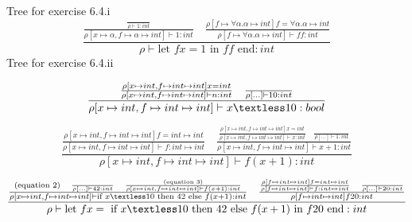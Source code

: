 \documentclass[]{report}
\begin{document}
Tree for exercise 6.4.i
\begin{equation}
\frac{\frac{\frac{}{\rho \vdash 1:int}}{\rho [x \mapsto \alpha ,f \mapsto \alpha \mapsto int] \vdash 1:int} \quad \frac{\rho [f \mapsto \forall \alpha . \alpha \mapsto int ] f = \forall \alpha . \alpha \mapsto int }{\rho [f \mapsto \forall \alpha . \alpha \mapsto int ] \vdash f f: int}}{\rho \vdash \text{let } f x = 1 \text{ in } f f \text{ end}:int}
\end{equation}
Tree for exercise 6.4.ii

\begin{equation}
\frac{\frac{\rho [x \mapsto int, f \mapsto int \mapsto int] x = int}{\rho [x \mapsto int, f \mapsto int \mapsto int] \vdash n : int} \quad \frac{}{\rho [...] \vdash 10:int}}{\rho [x \mapsto int, f \mapsto int \mapsto int] \vdash x \textless 10:bool}
\end{equation}

\begin{equation}
\frac{\frac{\rho [x \mapsto int, f \mapsto int \mapsto int] f = int \mapsto int}{\rho [x \mapsto int, f \mapsto int \mapsto int] \vdash f : int \mapsto int} \quad \frac{\frac{\rho [x \mapsto int, f \mapsto int \mapsto int] x = int }{\rho [x \mapsto int, f \mapsto int \mapsto int] \vdash x:int} \quad \frac{}{\rho [...] \vdash 1:int}}{\rho [x \mapsto int, f \mapsto int \mapsto int] \vdash x + 1:int}}{\rho [x \mapsto int, f \mapsto int \mapsto int] \vdash f(x+1):int}
\end{equation}

\begin{equation}
\frac{\frac{ (\text{equation } 2) \quad \frac{}{\rho [...] \vdash 42 : int} \quad \frac{\text{(equation } 3)}{\rho [x \mapsto int, f \mapsto int \mapsto int ] \vdash f(x+1):int}}{\rho [x \mapsto int, f \mapsto int \mapsto int] \vdash \text{if } x \textless 10 \text{ then } 42 \text{ else } f(x+1):int}\quad \frac{\frac{\rho [f \mapsto int \mapsto int] f = int \mapsto int}{\rho [f \mapsto int \mapsto int] \vdash f : int \mapsto int} \quad \frac{}{\rho [...] \vdash 20:int} }{\rho [f \mapsto int \mapsto int] f 20 : int}}{\rho \vdash \text{let } f x = \text{ if } x \textless 10 \text{ then } 42 \text{ else } f(x+1) \text{ in } f 20 \text{ end}:int}
\end{equation}
\end{document}
